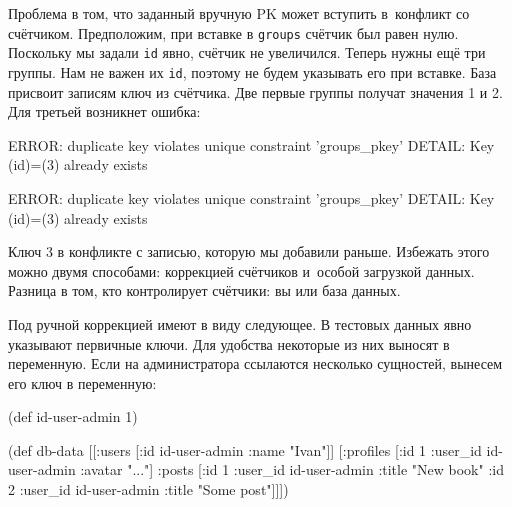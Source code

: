 \fi

Проблема в том, что заданный вручную PK может вступить в~конфликт со
счётчиком. Предположим, при вставке в \verb|groups| счётчик был равен
нулю. Поскольку мы задали \verb|id| явно, счётчик не увеличился. Теперь нужны
ещё три группы. Нам не важен их \verb|id|, поэтому не будем указывать его при
вставке. База присвоит записям ключ из счётчика. Две первые группы получат
значения 1 и 2. Для третьей возникнет ошибка:


\ifx\devicetype\mobile

\begin{english}
  \begin{text}
ERROR: duplicate key violates
       unique constraint 'groups_pkey'
DETAIL: Key (id)=(3) already exists
  \end{text}
\end{english}

\else

\begin{english}
  \begin{text}
ERROR: duplicate key violates unique constraint 'groups_pkey'
DETAIL: Key (id)=(3) already exists
  \end{text}
\end{english}

\fi

Ключ 3 в конфликте с записью, которую мы добавили раньше. Избежать этого можно
двумя способами: коррекцией счётчиков и~особой загрузкой данных. Разница в том,
кто контролирует счётчики: вы или база данных.

Под ручной коррекцией имеют в виду следующее. В тестовых данных явно указывают
первичные ключи. Для удобства некоторые из них выносят в переменную. Если на
администратора ссылаются несколько сущностей, вынесем его ключ в переменную:

\ifx\devicetype\mobile

\begin{english}
  \begin{clojure}
(def id-user-admin 1)

(def db-data
  [[:users [{:id id-user-admin
             :name "Ivan"}]]
   [:profiles [{:id 1
                :user_id id-user-admin
                :avatar "..."}]
    :posts [{:id 1
             :user_id id-user-admin
             :title "New book"}
            {:id 2
             :user_id id-user-admin
             :title "Some post"}]]])
  \end{clojure}
\end{english}

